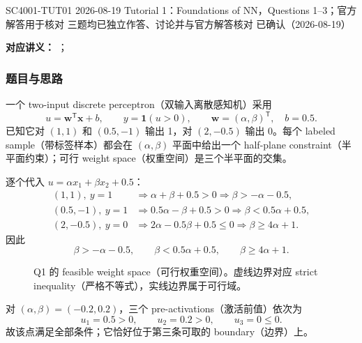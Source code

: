 
\label{tutorial:SC4001-TUT01}

\tutorialmeta
  {SC4001-TUT01}
  {2026-08-19}
  {Tutorial 1：Foundations of NN，Questions 1--3；官方解答用于核对}
  {三题均已独立作答、讨论并与官方解答核对}
  {已确认（2026-08-19）}


\textbf{对应讲义：}
；

\subsubsection*{题目与思路}

一个 two-input discrete perceptron（双输入离散感知机）采用
\[
  u=\bm w^{\mathsf T}\bm x+b,\qquad
  y=\mathbf 1(u>0),\qquad
  \bm w=(\alpha,\beta)^{\mathsf T},\quad b=0.5.
\]
已知它对 $(1,1)$ 和 $(0.5,-1)$ 输出 1，对 $(2,-0.5)$ 输出 0。每个 labeled sample（带标签样本）都会在 $(\alpha,\beta)$ 平面中给出一个 half-plane constraint（半平面约束）；可行 weight space（权重空间）是三个半平面的交集。

\begin{checkedsolution}
逐个代入 $u=\alpha x_1+\beta x_2+0.5$：
\begin{align*}
  (1,1),\ y=1
  &\Rightarrow \alpha+\beta+0.5>0
   \Rightarrow \beta>-\alpha-0.5,\\
  (0.5,-1),\ y=1
  &\Rightarrow 0.5\alpha-\beta+0.5>0
   \Rightarrow \beta<0.5\alpha+0.5,\\
  (2,-0.5),\ y=0
  &\Rightarrow 2\alpha-0.5\beta+0.5\le0
   \Rightarrow \beta\ge4\alpha+1.
\end{align*}
因此
\[
  \boxed{\beta>-\alpha-0.5,\qquad
         \beta<0.5\alpha+0.5,\qquad
         \beta\ge4\alpha+1.}
\]

\begin{figure}[htbp]
  \centering
  \resizebox{0.78\textwidth}{!}{}
  \caption{Q1 的 feasible weight space（可行权重空间）。虚线边界对应 strict inequality（严格不等式），实线边界属于可行域。}
  \label{fig:sc4001-tut01-weight-space}
\end{figure}

对 $(\alpha,\beta)=(-0.2,0.2)$，三个 pre-activations（激活前值）依次为
\[
  u_1=0.5>0,\qquad u_2=0.2>0,\qquad u_3=0\le0.
\]
故该点满足全部条件；它恰好位于第三条可取的 boundary（边界）上。
\end{checkedsolution}

